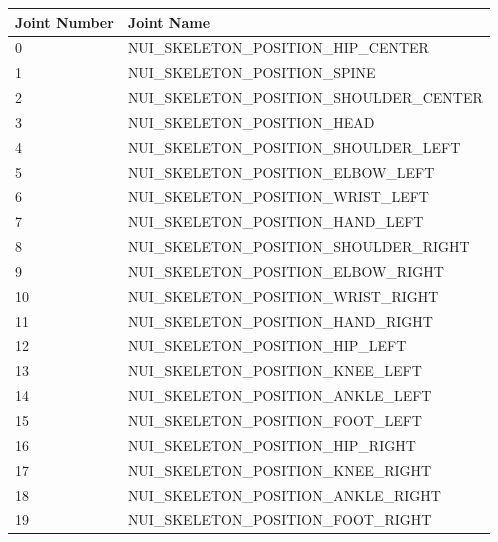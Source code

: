 \begin{center}
    \begin{tabular}{| l | l |}
    \hline
    Joint Number & Joint Name \\ \hline
    0 & NUI_SKELETON_POSITION_HIP_CENTER \\ \hline
    1 & NUI_SKELETON_POSITION_SPINE\\ \hline
    2 & NUI_SKELETON_POSITION_SHOULDER_CENTER\\ \hline
    3 & NUI_SKELETON_POSITION_HEAD\\ \hline
    4 & NUI_SKELETON_POSITION_SHOULDER_LEFT\\ \hline
    5 & NUI_SKELETON_POSITION_ELBOW_LEFT\\ \hline
    6 & NUI_SKELETON_POSITION_WRIST_LEFT\\ \hline
    7 & NUI_SKELETON_POSITION_HAND_LEFT\\ \hline
    8 & NUI_SKELETON_POSITION_SHOULDER_RIGHT\\ \hline
    9 & NUI_SKELETON_POSITION_ELBOW_RIGHT\\ \hline
    10 & NUI_SKELETON_POSITION_WRIST_RIGHT\\ \hline
    11 & NUI_SKELETON_POSITION_HAND_RIGHT\\ \hline
    12 & NUI_SKELETON_POSITION_HIP_LEFT\\ \hline
    13 & NUI_SKELETON_POSITION_KNEE_LEFT\\ \hline
    14 & NUI_SKELETON_POSITION_ANKLE_LEFT\\ \hline
    15 & NUI_SKELETON_POSITION_FOOT_LEFT\\ \hline
    16 & NUI_SKELETON_POSITION_HIP_RIGHT\\ \hline
    17 & NUI_SKELETON_POSITION_KNEE_RIGHT\\ \hline
    18 & NUI_SKELETON_POSITION_ANKLE_RIGHT\\ \hline
    19 & NUI_SKELETON_POSITION_FOOT_RIGHT\\ \hline
    \hline
    \end{tabular}
\end{center}

